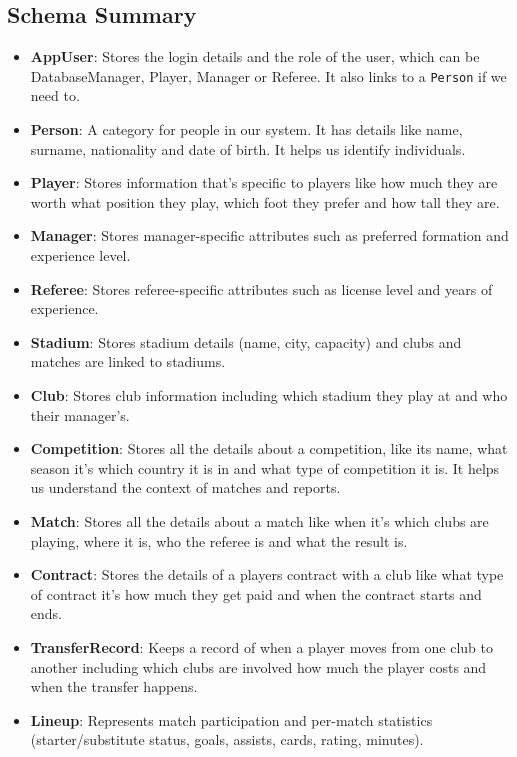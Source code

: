 \documentclass[12pt]{article}
\begin{document}
\subsection{Schema Summary}
\begin{itemize}
    \item \textbf{AppUser}: Stores the login details and the role of the user, which can be DatabaseManager, Player, Manager or Referee. It also links to a \texttt{Person} if we need to.
    \item \textbf{Person}: A category for people in our system. It has details like name, surname, nationality and date of birth. It helps us identify individuals.
    \item \textbf{Player}: Stores  information that's specific to players like how much they are worth what position they play, which foot they prefer and how tall they are.
    \item \textbf{Manager}: Stores manager-specific attributes such as preferred formation and experience level.
    \item \textbf{Referee}: Stores referee-specific attributes such as license level and years of experience.
    \item \textbf{Stadium}: Stores stadium details (name, city, capacity) and clubs and matches are linked to stadiums.
    \item \textbf{Club}: Stores club information including which stadium they play at and who their manager's.
    \item \textbf{Competition}: Stores all the details about a competition, like its name, what season it's which country it is in and what type of competition it is. It helps us understand the context of matches and reports.
    \item \textbf{Match}: Stores all the details about a match like when it's which clubs are playing, where it is, who the referee is and what the result is.
    \item \textbf{Contract}: Stores the details of a players contract with a club like what type of contract it's how much they get paid and when the contract starts and ends.
    \item \textbf{TransferRecord}: Keeps a record of when a player moves from one club to another including which clubs are involved how much the player costs and when the transfer happens.
    \item \textbf{Lineup}: Represents match participation and per-match statistics (starter/substitute status, goals, assists, cards, rating, minutes).
\end{itemize}
\end{document}
